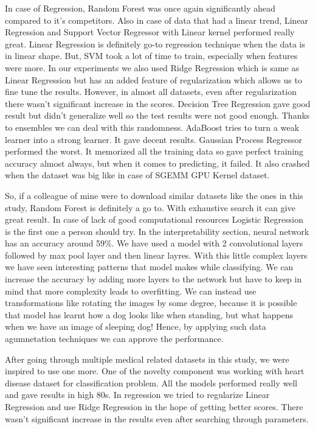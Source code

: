 \documentclass[10pt,twocolumn,letterpaper]{article}
\begin{document}
\newline In case of Regression, Random Forest was once again significantly ahead compared to it's competitors. Also in case of data that had a linear trend, Linear Regression and Support Vector Regressor with Linear kernel performed really great. Linear Regression is definitely go-to regression technique when the data is in linear shape. But, SVM took a lot of time to train, especially when features were more. In our experiments we also used Ridge Regression which is same as Linear Regression but has an added feature of regularization which allows us to fine tune the results. However, in almost all datasets, even after regularization there wasn't significant increase in the scores. Decision Tree Regression gave good result but didn't generalize well so the test results were not good enough. Thanks to ensembles we can deal with this randomness. AdaBoost tries to turn a weak learner into a strong learner. It gave decent results. Gaussian Process Regressor performed the worst. It memorized all the training data so gave perfect training accuracy almost always, but when it comes to predicting, it failed. It also crashed when the dataset was big like in case of SGEMM GPU Kernel dataset. 


So, if a colleague of mine were to download similar datasets like the ones in this study, Random Forest is definitely a go to. With exhaustive search it can give great result. In case of lack of good computational resources Logistic Regression is the first one a person should try.
\newline In the interpretability section, neural network has an accuracy around 59\%. We have used a model with 2 convolutional layers followed by max pool layer and then linear layres. With this little complex layers we have seen interesting patterns that model makes while classifying. We can increase the accuracy by adding more layers to the network but have to keep in mind that more complexity leads to overfitting. We can instead use transformations like rotating the images by some degree, because it is possible that model has learnt how a dog looks like when standing, but what happens when we have an image of sleeping dog! Hence, by applying such data agumnetation techniques we can approve the performance.

After going through multiple medical related datasets in this study, we were inspired to use one more. One of the novelty component was working with heart disease dataset for classification problem. All the models performed really well and gave results in high 80s. In regression we tried to regularize Linear Regression and use Ridge Regression in the hope of getting better scores. There wasn't significant increase in the results even after searching through parameters.
\end{document}
